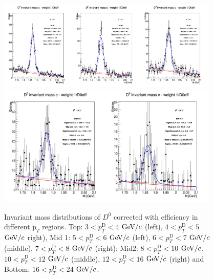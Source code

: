\begin{figure}[!htp]
\centering
{\includegraphics[width=0.94\textwidth]{figures/Dzero/InvMassDistributions_Dzero_Bins9to11.png}}
{\includegraphics[width=0.94\textwidth]{figures/Dzero/InvMassDistributions_Dzero_Bins12to13.png}}

\caption{Invariant mass distributions of $D^0$ corrected with efficiency in different $\text{p}_T$ regions. Top: $3< p_{T}^{\text{D}}< 4$ $\mathrm{GeV}/c$ (left), $4< p_{T}^{\text{D}}< 5$ $\mathrm{GeV}/c$ right), Mid 1: $5< p_{T}^{\text{D}}< 6$ $\mathrm{GeV}/c$ (left), $6 < p_{T}^{\text{D}} < 7$ $\mathrm{GeV}/c$ (middle), $7< p_{T}^{\text{D}}< 8$ $\mathrm{GeV}/c$ (right); Mid2: $8< p_{T}^{\text{D}}< 10$ $\mathrm{GeV}/c$, $10< p_{T}^{\text{D}}< 12$ $\mathrm{GeV}/c$  (middle), $12 < p_{T}^{\text{D}}< 16$ $\mathrm{GeV}/c$  (right) and Bottom: $16<p_{T}^{\text{D}}< 24$ $\mathrm{GeV}/c$.}
\label{fig:InvMassD0}
\end{figure}

